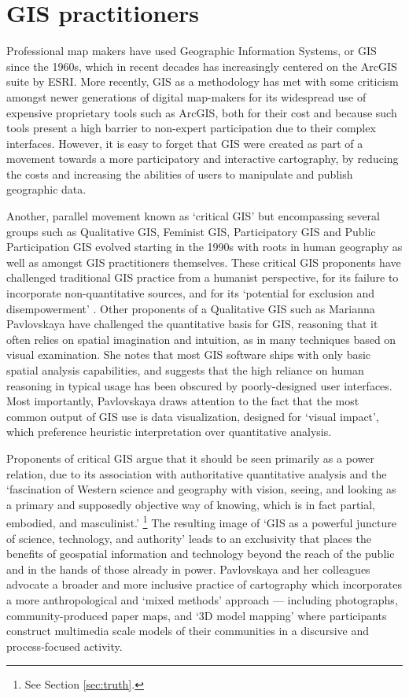 \documentclass[11pt,oneside,notitlepage]{report}
\begin{document}
\section{GIS practitioners}
\label{sec:gis}

Professional map makers have used Geographic Information Systems, or GIS since the 1960s, which in recent decades has increasingly centered on the ArcGIS suite by ESRI. More recently, GIS as a methodology has met with some criticism amongst newer generations of digital map-makers for its widespread use of expensive proprietary tools such as ArcGIS, both for their cost and because such tools present a high barrier to non-expert participation due to their complex interfaces. However, it is easy to forget that GIS were created as part of a movement towards a more participatory and interactive cartography, by reducing the costs and increasing the abilities of users to manipulate and publish geographic data.

Another, parallel movement known as `critical GIS' but encompassing several groups such as Qualitative GIS, Feminist GIS, Participatory GIS and Public Participation GIS evolved starting in the 1990s with roots in human geography as well as amongst GIS practitioners themselves. These critical GIS proponents have challenged traditional GIS practice from a humanist perspective, for its failure to incorporate non-quantitative sources, and for its `potential for exclusion and disempowerment' \cite{elwood2009qualitative}. Other proponents of a Qualitative GIS such as Marianna Pavlovskaya have challenged the quantitative basis for GIS, reasoning that it often relies on spatial imagination and intuition, as in many techniques based on visual examination. She notes that most GIS software ships with only basic spatial analysis capabilities, and suggests that the high reliance on human reasoning in typical usage has been obscured by poorly-designed user interfaces. Most importantly, Pavlovskaya draws attention to the fact that the most common output of GIS use is data visualization, designed for `visual impact', which preference heuristic interpretation over quantitative analysis. \cite{pavlovskaya2009nonquantitative} 

Proponents of critical GIS argue that it should be seen primarily as a power relation, due to its association with authoritative quantitative analysis and the `fascination of Western science and geography with vision, seeing, and looking as a primary and supposedly objective way of knowing, which is in fact partial, embodied, and masculinist.' \cite{pavlovskaya2009nonquantitative}\footnote{See Section \ref{sec:truth}.} The resulting image of `GIS as a powerful juncture of science, technology, and authority' \cite{pavlovskaya2009nonquantitative} leads to an exclusivity that places the benefits of geospatial information and technology beyond the reach of the public and in the hands of those already in power. Pavlovskaya and her colleagues advocate a broader and more inclusive practice of cartography which incorporates a more anthropological and `mixed methods' approach --- including photographs, community-produced paper maps, and `3D model mapping' where participants construct multimedia scale models of their communities in a discursive and process-focused activity. 
\end{document}
